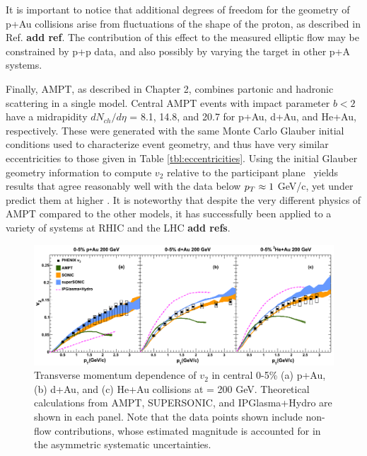 It is important to notice that additional degrees of freedom for the geometry of p+Au collisions arise from fluctuations of the shape of the proton, as described in Ref. \textbf{add ref}. The contribution of this effect to the measured elliptic flow may be constrained by p+p data, and also possibly by varying the target in other p+A systems.

Finally, AMPT, as described in Chapter 2, combines partonic and hadronic scattering in a single model. Central AMPT events with impact parameter $b<2$ have a midrapidity $dN_{ch}/d\eta$ = 8.1, 14.8, and 20.7 for p+Au, d+Au, and He+Au, respectively. These were generated with the same Monte Carlo Glauber initial conditions used to characterize event geometry, and thus have very similar eccentricities to those given in Table \ref{tbl:eccentricities}. Using the initial Glauber geometry information to compute $v_2$ relative to the participant plane~\cite{Koop:2015wea} yields results that agree reasonably well with the data below $\mbox{$p_T$} \approx 1$ GeV/c, yet under predict them at higher \pt. It is noteworthy that despite the very different physics of AMPT compared to the other models, it has successfully been applied to a variety of systems at RHIC and the LHC \textbf{add refs}. 

\begin{figure}[!ht]
\begin{center}
\includegraphics[width=1.0\linewidth]{figs/indepth_theory_comparison.png}
\caption{Transverse momentum dependence of $v_2$ in central 0-5\% (a) p+Au, (b) d+Au, and (c) He+Au collisions at \sqsn = 200 GeV. Theoretical calculations from AMPT, SUPERSONIC, and IPGlasma+Hydro are shown in each panel. Note that the data points shown include non-flow contributions, whose estimated magnitude is accounted for in the asymmetric systematic uncertainties.}
\label{fig:indepth_comp_three}
\end{center}
\end{figure}

